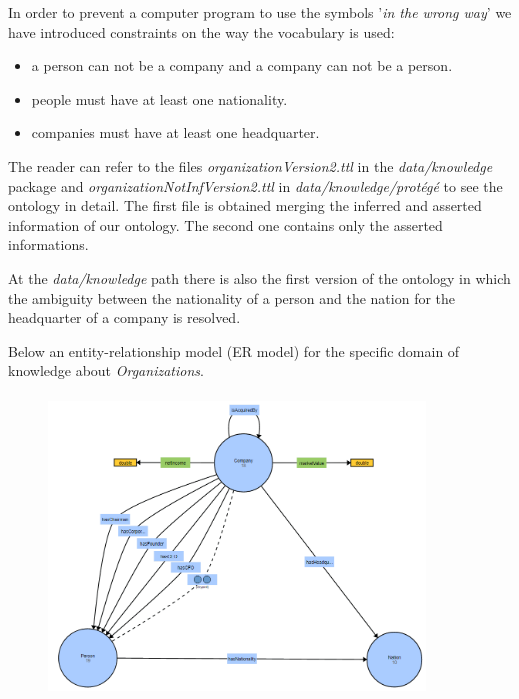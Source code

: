 In order to prevent a computer program to use the symbols '\textit{in the wrong way}' we have introduced  constraints on the way the vocabulary is used:
\begin{itemize}
\item a person can not be a company and a company can not be a person.
\item people must have at least one nationality.
\item companies must have at least one headquarter. 
\end{itemize}

The reader can refer to the files \textit{organizationVersion2.ttl} in the \textit{data/knowledge} package and \textit{organizationNotInfVersion2.ttl} in \textit{data/knowledge/protégé} to see the ontology in detail. The first file is obtained merging the inferred and asserted information of our ontology. The second one contains only the asserted informations.  

At the \textit{data/knowledge} path there is also the first version of the ontology in which the ambiguity between the nationality of a person and the nation for the headquarter of a company is resolved.

Below an entity-relationship model (ER model) for the specific domain of knowledge about \textit{Organizations}.
\begin{figure}[H]
\centering
\includegraphics[width=10cm, height=8cm]{fig/ERDiagram.png}
\end{figure}

